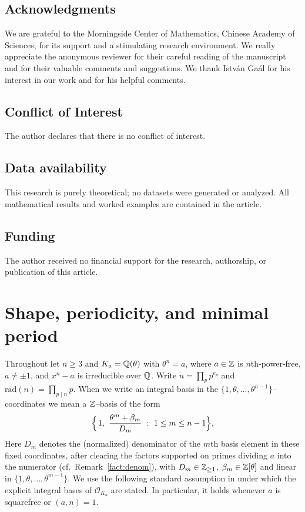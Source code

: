 \documentclass[12pt,a4paper,oneside]{amsart}
\theoremstyle{definition}
\begin{document}
\subsection*{Acknowledgments}
We are grateful to the Morningside Center of Mathematics, Chinese Academy of Sciences, for its support and a stimulating research environment. We really appreciate the anonymous reviewer for their careful reading of the manuscript and for their valuable comments and suggestions. We thank Istv\'an Ga\'al for his interest in our work and for his helpful comments.

\subsection*{Conflict of Interest}
The author declares that there is no conflict of interest.

\subsection*{Data availability}
This research is purely theoretical; no datasets were generated or analyzed. All mathematical results and worked examples are contained in the article.

\subsection*{Funding}

The author received no financial support for the research, authorship, or publication of this article.

\section{Shape, periodicity, and minimal period}\label{sec:defs}

Throughout let $n\ge3$ and $K_a=\Bbb Q(\theta)$ with $\theta^n=a$, where $a\in\Bbb Z$ is $n$th‑power‑free, $a\neq\pm1$, and $x^n-a$ is irreducible over $\Bbb Q$. Write $n=\prod_{p}p^{e_p}$ and $\mathrm{rad}(n)=\prod_{p\mid n}p$.  When we write an integral basis in the $\{1,\theta,\dots,\theta^{n-1}\}$–coordinates we mean a $\Bbb Z$–basis of the form
\[
\Bigl\{\,1,\ \frac{\theta^m+\beta_m}{D_m}\ :\ 1\le m\le n-1\Bigr\},
\]
Here $D_m$ denotes the (normalized) denominator of the $m$th basis element in these fixed coordinates, after clearing the factors supported on primes dividing $a$ into the numerator (cf.\ Remark~\ref{fact:denom}),
with $D_m\in\Bbb Z_{\ge1}$, $\beta_m\in\Bbb Z[\theta]$ and linear in $\{1,\theta,\dots,\theta^{m-1}\}$. We use the following standard assumption in \cite{JKS21} under which the explicit integral bases of $\mathcal O_{K_a}$ are stated. In particular, it holds whenever $a$ is squarefree or $(a,n)=1$. 
\end{document}
